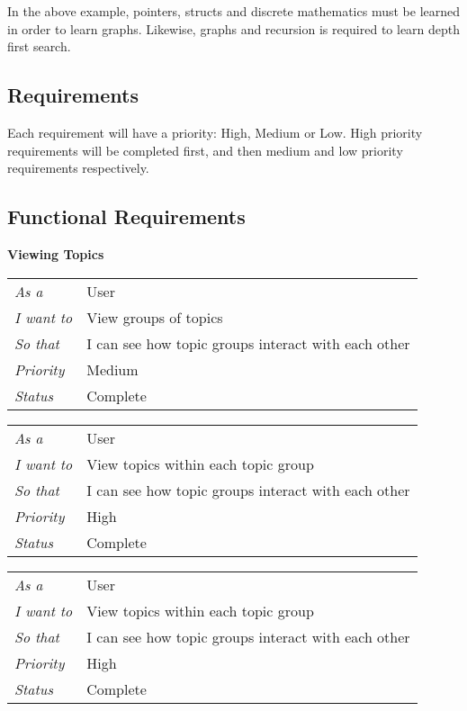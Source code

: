 In the above example, pointers, structs and discrete mathematics must be learned in order to learn graphs. Likewise, graphs and recursion is required to learn depth first search.\\

\subsection{Requirements}
Each requirement will have a priority: High, Medium or Low. High priority requirements will be completed first, and then medium and low priority requirements respectively. \\

\subsection{Functional Requirements}

\textbf{Viewing Topics}

\begin{table}[]
\begin{tabular}{ll}
\textit{As a}      & User                                                \\
\textit{I want to} & View groups of topics                               \\
\textit{So that}   & I can see how topic groups interact with each other \\
\textit{Priority}  & {\color[HTML]{FE996B} Medium}                         \\
\textit{Status}    & Complete  
\end{tabular}
\end{table}

\begin{table}[]
\begin{tabular}{ll}
\textit{As a}      & User                                                \\
\textit{I want to} & View topics within each topic group                 \\
\textit{So that}   & I can see how topic groups interact with each other \\
\textit{Priority}  & {\color[HTML]{FE0000} High}                         \\
\textit{Status}    & Complete  
\end{tabular}
\end{table}

\begin{table}[]
\begin{tabular}{ll}
\textit{As a}      & User                                                \\
\textit{I want to} & View topics within each topic group                 \\
\textit{So that}   & I can see how topic groups interact with each other \\
\textit{Priority}  & {\color[HTML]{FE0000} High}                         \\
\textit{Status}    & Complete     
\end{tabular}
\end{table}

